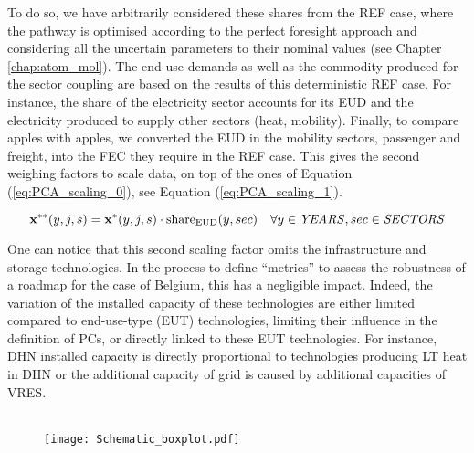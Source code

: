 To do so, we have arbitrarily considered these shares from the REF case, where the pathway is optimised according to the perfect foresight approach and considering all the uncertain parameters to their nominal values (see Chapter \ref{chap:atom_mol}).  The end-use-demands as well as the commodity produced for the sector coupling are based on the results of this deterministic REF case.  For instance, the share of the electricity sector accounts for its \gls{EUD} and the electricity produced to supply other sectors (\eg heat, mobility). Finally, to compare apples with apples, we converted the \gls{EUD} in the mobility sectors, \ie passenger and freight, into the \gls{FEC} they require in the REF case. This gives the second weighing factors to scale data, on top of the ones of Equation (\ref{eq:PCA_scaling_0}), see Equation (\ref{eq:PCA_scaling_1}).

\begin{equation}
 \label{eq:PCA_scaling_1}
\textbf{x}^{**}(y,j,s)=\textbf{x}^{*}(y,j,s)\cdot \text{share}_{\text{EUD}}(y,sec)
 \quad \forall y \in \text{\emph{YEARS}}, sec \in \text{\emph{SECTORS}}
\end{equation}

One can notice that this second scaling factor omits the infrastructure and storage technologies. In the process to define ``metrics'' to assess the robustness of a roadmap for the case of Belgium, this has a negligible impact. Indeed, the variation of the installed capacity of these technologies are either limited compared to end-use-type (EUT) technologies, \ie limiting their influence in the definition of PCs, or directly linked to these EUT technologies. For instance, \gls{DHN} installed capacity is directly proportional to technologies producing \gls{LT} heat in \gls{DHN} or the additional capacity of grid is caused by additional capacities of \gls{VRES}. \\

\\

\begin{wrapfigure}{r}{3cm}
\centering
\captionsetup{justification=centering}
\texttt{[image: Schematic\_boxplot.pdf]}
\caption{}
\label{fig:Schematic_boxplot_methodo}
\end{wrapfigure}

